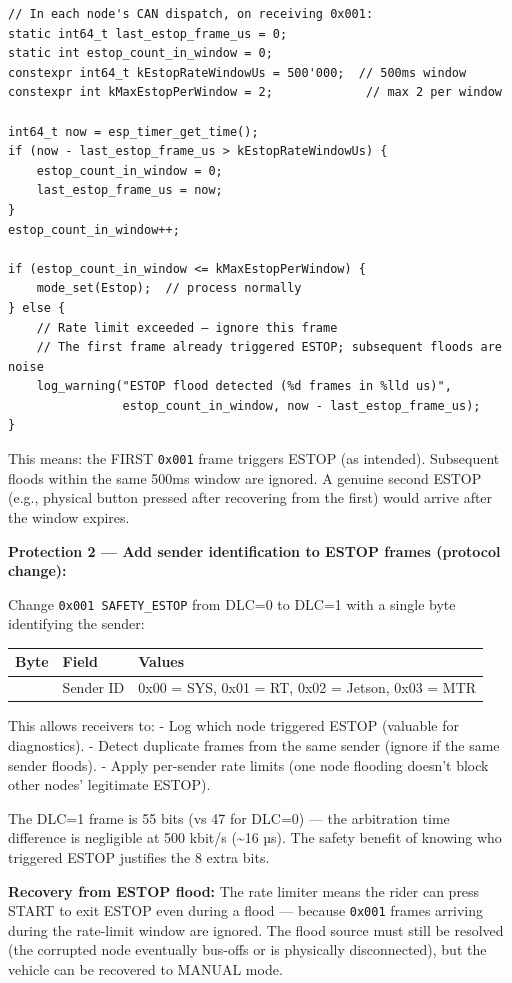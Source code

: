 \documentclass[12pt,a4paper,oneside]{report}
\begin{document}
\begin{verbatim}
// In each node's CAN dispatch, on receiving 0x001:
static int64_t last_estop_frame_us = 0;
static int estop_count_in_window = 0;
constexpr int64_t kEstopRateWindowUs = 500'000;  // 500ms window
constexpr int kMaxEstopPerWindow = 2;             // max 2 per window

int64_t now = esp_timer_get_time();
if (now - last_estop_frame_us > kEstopRateWindowUs) {
    estop_count_in_window = 0;
    last_estop_frame_us = now;
}
estop_count_in_window++;

if (estop_count_in_window <= kMaxEstopPerWindow) {
    mode_set(Estop);  // process normally
} else {
    // Rate limit exceeded — ignore this frame
    // The first frame already triggered ESTOP; subsequent floods are noise
    log_warning("ESTOP flood detected (%d frames in %lld us)",
                estop_count_in_window, now - last_estop_frame_us);
}
\end{verbatim}

This means: the FIRST \texttt{0x001} frame triggers ESTOP (as intended).
Subsequent floods within the same 500ms window are ignored. A genuine second
ESTOP (e.g., physical button pressed after recovering from the first) would
arrive after the window expires.

\textbf{Protection 2 --- Add sender identification to ESTOP frames (protocol
change):}

Change \texttt{0x001\ SAFETY\_ESTOP} from DLC=0 to DLC=1 with a single byte
identifying the sender:

\begin{longtable}[]{@{}lll@{}}
\toprule\noalign{}
Byte & Field & Values \\
\midrule\noalign{}
\endhead
\bottomrule\noalign{}
\endlastfoot
0 & Sender ID & 0x00 = SYS, 0x01 = RT, 0x02 = Jetson, 0x03 = MTR \\
\end{longtable}

This allows receivers to: - Log which node triggered ESTOP (valuable for
diagnostics). - Detect duplicate frames from the same sender (ignore if the same
sender floods). - Apply per-sender rate limits (one node flooding doesn't block
other nodes' legitimate ESTOP).

The DLC=1 frame is 55 bits (vs 47 for DLC=0) --- the arbitration time difference
is negligible at 500 kbit/s (\textasciitilde16 µs). The safety benefit of
knowing who triggered ESTOP justifies the 8 extra bits.

\textbf{Recovery from ESTOP flood:} The rate limiter means the rider can press
START to exit ESTOP even during a flood --- because \texttt{0x001} frames
arriving during the rate-limit window are ignored. The flood source must still
be resolved (the corrupted node eventually bus-offs or is physically
disconnected), but the vehicle can be recovered to MANUAL mode.
\end{document}
